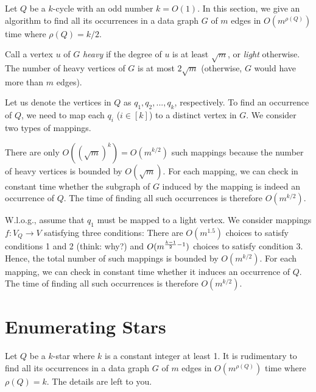 Let $Q$ be a $k$-cycle with an odd number $k = O(1)$. In this section, we give an algorithm to find all its occurrences in a data graph $G$ of $m$ edges in $O(m^{\rho(Q)})$ time where $\rho(Q) = k/2$.

\vgap

Call a vertex $u$ of $G$ {\em heavy} if the degree of $u$ is at least $\sqrt{m}$, or {\em light} otherwise. The number of heavy vertices of $G$ is at most $2 \sqrt{m}$ (otherwise, $G$ would have more than $m$ edges).

\vgap

Let us denote the vertices in $Q$ as $q_1, q_2, ..., q_k$, respectively. To find an occurrence of $Q$, we need to map each $q_i$ ($i \in [k]$) to a distinct vertex in $G$. We consider two types of mappings.

 There are only $O((\sqrt{m})^k) = O(m^{k/2})$ such mappings because the number of heavy vertices is bounded by $O(\sqrt{m})$. For each mapping, we can check in constant time whether the subgraph of $G$ induced by the mapping is indeed an occurrence of $Q$. The time of finding all such occurrences is therefore $O(m^{k/2})$.

 W.l.o.g., assume that $q_1$ must be mapped to a light vertex. We consider mappings $f: V_Q \rightarrow V$ satisfying three conditions:
There are $O(m^{1.5})$ choices to satisfy conditions 1 and 2 (think: why?) and $O(m^{\frac{k-1}{2}-1})$ choices to satisfy condition 3. Hence, the total number of such mappings is bounded by $O(m^{k/2})$. For each mapping, we can check in constant time whether it induces an occurrence of $Q$. The time of finding all such occurrences is therefore $O(m^{k/2})$.

\section{Enumerating Stars} \label{sec:star}

Let $Q$ be a $k$-star where $k$ is a constant integer at least 1. It is rudimentary to find all its occurrences in a data graph $G$ of $m$ edges in $O(m^{\rho(Q)})$ time where $\rho(Q) = k$. The details are left to you.

